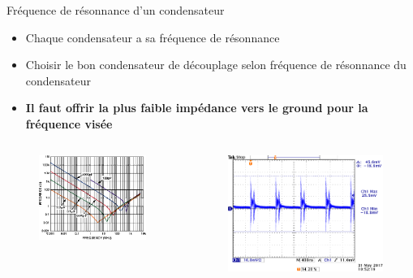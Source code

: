 \begin{frame}{Fréquence de résonnance d'un condensateur}
    \begin{itemize}
        \item Chaque condensateur a sa fréquence de résonnance
        \item Choisir le bon condensateur de découplage selon fréquence de résonnance du condensateur
        \item \textbf{Il faut offrir la plus faible impédance vers le ground pour la fréquence visée}
    \end{itemize}
    \vspace{-18pt}
    \begin{columns}
        \begin{column}{0.5\textwidth}
            \begin{figure}
                \includegraphics[width=\textwidth, height=0.75\textheight, keepaspectratio]{pictures/capacitor-resonant-frequency.png}
            \end{figure}
        \end{column}
        \begin{column}{0.5\textwidth}
            \begin{figure}
                \includegraphics[width=\textwidth, height=0.75\textheight, keepaspectratio]{pictures/switching-psu-ripple.png}

\end{figure}
\end{column}
\end{columns}
\end{frame}
